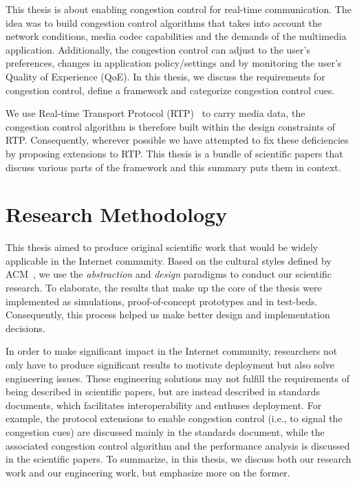 This thesis is about enabling congestion control for real-time communication.
The idea was to build congestion control algorithms that takes into account
the network conditions, media codec capabilities and the demands of the
multimedia application. Additionally, the congestion control can adjust to the
user's preferences, changes in application policy/settings and by monitoring
the user's Quality of Experience (QoE). In this thesis, we discuss the
requirements for congestion control, define a framework and categorize
congestion control cues.


We use Real-time Transport Protocol (RTP)~\cite{rfc3550} to carry media data,
the congestion control algorithm is therefore built within the design
constraints of RTP. Consequently, wherever possible we have attempted to fix
these deficiencies by proposing extensions to RTP. This thesis is a bundle of
scientific papers that discuss various parts of the framework and this summary
puts them in context.


\section{Research Methodology}

This thesis aimed to produce original scientific work that would be widely
applicable in the Internet community. Based on the cultural styles defined by
ACM~\cite{Denning:CS.Method}, we use the \textit{abstraction} and
\textit{design} paradigms to conduct our scientific research. To elaborate,
the results that make up the core of the thesis were implemented as
simulations, proof-of-concept prototypes and in test-beds. Consequently, this
process helped us make better design and implementation decisions.

In order to make significant impact in the Internet community, researchers not
only have to produce significant results to motivate deployment but also solve
engineering issues. These engineering solutions may not fulfill the
requirements of being described in scientific papers, but are instead
described in standards documents, which facilitates interoperability and
enthuses deployment. For example, the protocol extensions to enable congestion
control (i.e., to signal the congestion cues) are discussed mainly in the
standards document, while the associated congestion control algorithm and the
performance analysis is discussed in the scientific papers. To summarize, in
this thesis, we discuss both our research work and our engineering work, but
emphasize more on the former.



